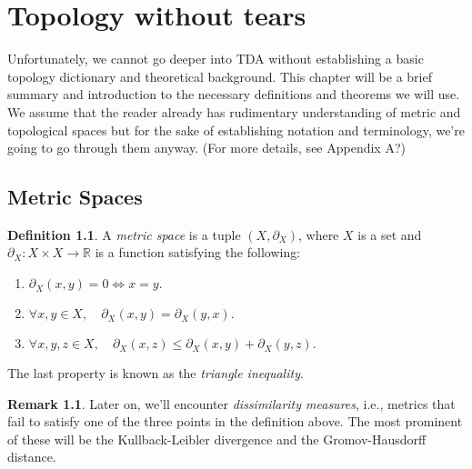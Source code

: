 \chapter{Topology without tears}
\graphicspath{ {/home/tomasp/Dokumenty/Master_Thesis/figures/} }
\theoremstyle{definition}
\newtheorem{definition}{Definition}[section]
\newtheorem{theorem}{Theorem}[section]
\newtheorem{lemma}{Lemma}[section]
\newtheorem{corollary}{Corollary}[section]
\newtheorem{example}{Example}[section]
\newtheorem*{remark}{Remark}

Unfortunately, we cannot go deeper into TDA without establishing a basic topology dictionary and theoretical background. This chapter will be a brief summary and introduction to the necessary definitions and theorems we will use. We assume that the reader already has rudimentary understanding of metric and topological spaces but for the sake of establishing notation and terminology, we're going to go through them anyway. (For more details, see Appendix A?)

\section{Metric Spaces}

\begin{definition}
  A \textit{metric space} is a tuple $(X, \partial_{X})$, where $X$ is a set and $\partial_{X}: X \times X \to \mathbb{R}$ is a function satisfying the following:
  \begin{enumerate}[label=\arabic*)]
    \centering
    \item $\partial_{X}(x,y) = 0 \iff x = y.$
    \item $\forall x,y \in X, \quad \partial_{X}(x,y) = \partial_{X}(y,x).$
    \item $\forall x,y,z \in X, \quad \partial_{X}(x,z) \leq \partial_{X}(x,y) + \partial_{X}(y,z).$
  \end{enumerate}
\end{definition}
The last property is known as the \textit{triangle inequality}.

\begin{remark}
Later on, we'll encounter \textit{dissimilarity measures}, i.e., metrics that fail to satisfy one of the three points in the definition above. The most prominent of these will be the Kullback-Leibler divergence and the Gromov-Hausdorff distance.
\end{remark}

